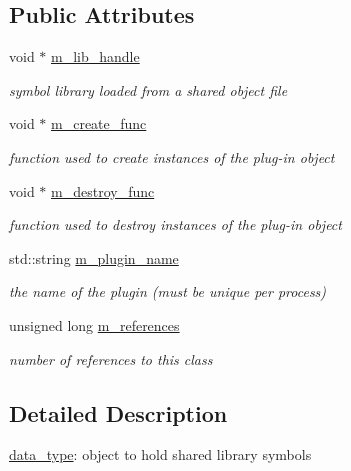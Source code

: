 \subsection*{Public Attributes}
\begin{DoxyCompactItemize}
\item 
void $\ast$ \hyperlink{structpion_1_1plugin_1_1data__type_ab53016d3d93ba84c07490a413fd01bcf}{m\-\_\-lib\-\_\-handle}
\begin{DoxyCompactList}\small\item\em symbol library loaded from a shared object file \end{DoxyCompactList}\item 
void $\ast$ \hyperlink{structpion_1_1plugin_1_1data__type_a11bd2c34a50310a4ed6042eae415c0c4}{m\-\_\-create\-\_\-func}
\begin{DoxyCompactList}\small\item\em function used to create instances of the plug-\/in object \end{DoxyCompactList}\item 
void $\ast$ \hyperlink{structpion_1_1plugin_1_1data__type_a19893ea2b05e69dfb2b346ee5f7aea41}{m\-\_\-destroy\-\_\-func}
\begin{DoxyCompactList}\small\item\em function used to destroy instances of the plug-\/in object \end{DoxyCompactList}\item 
std\-::string \hyperlink{structpion_1_1plugin_1_1data__type_a9ae35daeb06cf5f00675ff690d37db69}{m\-\_\-plugin\-\_\-name}
\begin{DoxyCompactList}\small\item\em the name of the plugin (must be unique per process) \end{DoxyCompactList}\item 
unsigned long \hyperlink{structpion_1_1plugin_1_1data__type_a2536d38120032c485b556d174ad46013}{m\-\_\-references}
\begin{DoxyCompactList}\small\item\em number of references to this class \end{DoxyCompactList}\end{DoxyCompactItemize}


\subsection{Detailed Description}
\hyperlink{structpion_1_1plugin_1_1data__type}{data\-\_\-type}\-: object to hold shared library symbols 

